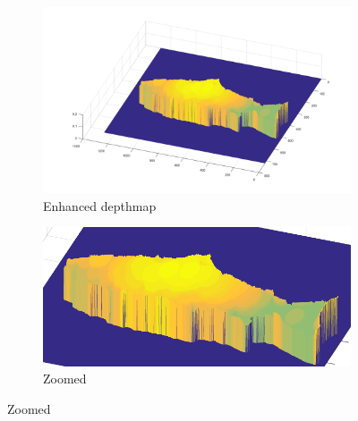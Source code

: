 \begin{figure}[H]
    \medskip
    \begin{subfigure}{0.41\textwidth}
        \includegraphics[width=\linewidth]{images/results/3D_plots/fixed_3D_63}
        \caption{Enhanced depthmap}
    \end{subfigure}\hspace*{\fill}
    \begin{subfigure}{0.57\textwidth}
        \includegraphics[width=\linewidth]{images/results/3D_plots/zoomed_fixed_3D_63}
        \caption{Zoomed}
    \end{subfigure}
    

\end{figure}
